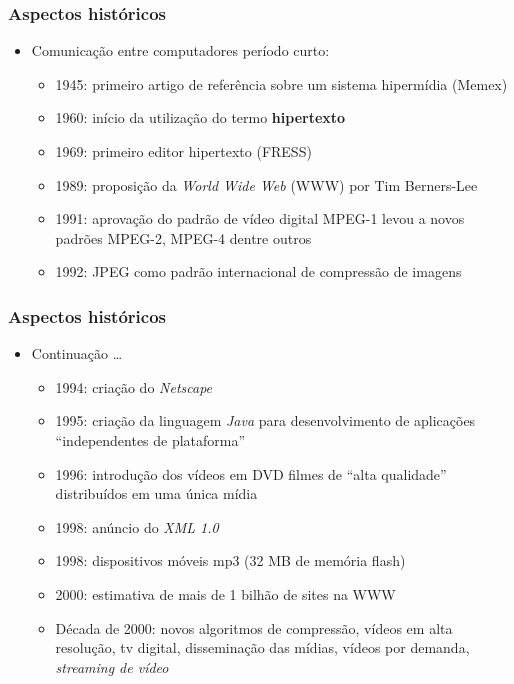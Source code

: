 \documentclass[xcolor]{beamer}
\begin{document}
\begin{frame}
    \frametitle{Aspectos históricos}

    \begin{itemize}
        \item Comunicação entre computadores \implica período curto:

        \begin{itemize}
            \item 1945: primeiro artigo de referência sobre um sistema
hipermídia (Memex)
            \item 1960: início da utilização do termo {\bf hipertexto}
            \item 1969: primeiro editor hipertexto (FRESS)
            \item 1989: proposição da {\it World Wide Web} (WWW) por Tim
Berners-Lee
            \item 1991: aprovação do padrão de vídeo digital MPEG-1 \implica
levou a novos padrões MPEG-2, MPEG-4 dentre outros
            \item 1992: JPEG como padrão internacional de compressão de imagens
        \end{itemize}
    \end{itemize}
\end{frame}

\begin{frame}
    \frametitle{Aspectos históricos}

    \begin{itemize}
        \item Continuação \ldots
        \begin{itemize}
            \item 1994: criação do {\it Netscape}
            \item 1995: criação da linguagem {\it Java} para desenvolvimento de
aplicações ``independentes de plataforma''
            \item 1996: introdução dos vídeos em DVD \implica filmes de ``alta
qualidade'' distribuídos em uma única mídia
            \item 1998: anúncio do {\it XML 1.0}
            \item 1998: dispositivos móveis mp3 (32 MB de memória flash)
            \item 2000: estimativa de mais de 1 bilhão de sites na WWW
            \item Década de 2000: novos algoritmos de compressão, vídeos em alta
resolução, tv digital, disseminação das mídias, vídeos por demanda, \it
streaming de vídeo
        \end{itemize}
    \end{itemize}
\end{frame}
\end{document}
